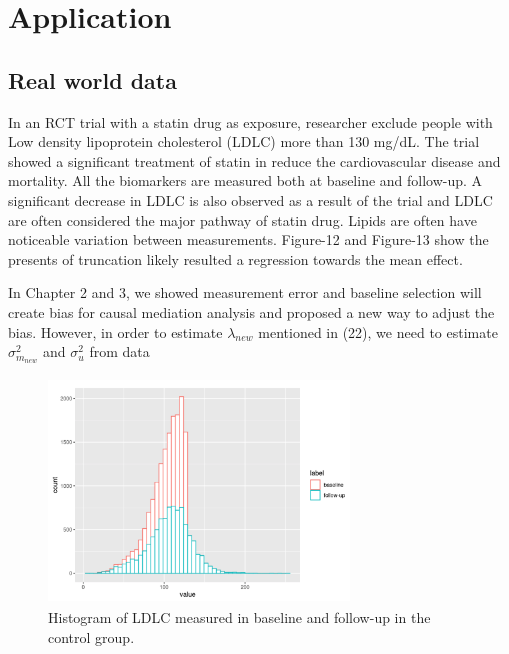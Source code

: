 \documentclass{article}
\begin{document}
\pagebreak
\clearpage

\section{Application}

\subsection{Real world data}

In an RCT trial with a statin drug as exposure, researcher exclude people with Low density lipoprotein cholesterol (LDLC) more than 130 mg/dL.\cite{ridker2008rosuvastatin}  The trial showed a significant treatment of statin in reduce the cardiovascular disease and mortality. All the biomarkers are measured both at baseline and follow-up. A significant decrease in LDLC is also observed as a result of the trial and LDLC are often considered the major pathway of statin drug. \cite{chen2000direct}\cite{stancu2001statins} Lipids are often have noticeable variation between measurements.  Figure-12 and Figure-13 show the presents of truncation likely resulted a regression towards the mean effect. 


In Chapter 2 and 3, we showed measurement error and baseline selection will create bias for causal mediation analysis and proposed a new way to adjust the bias. However, in order to estimate $\lambda_{new}$ mentioned in (22), we need to estimate $\sigma^2_{m_{new}}$ and $\sigma^2_u$ from data


\begin{figure}[h]
\centering
\includegraphics[width = 8cm,height = 6cm]{figure-10.png}
\caption{Histogram of LDLC measured in baseline and follow-up in the control group.}
\label{fig10}
\end{figure}
\end{document}
